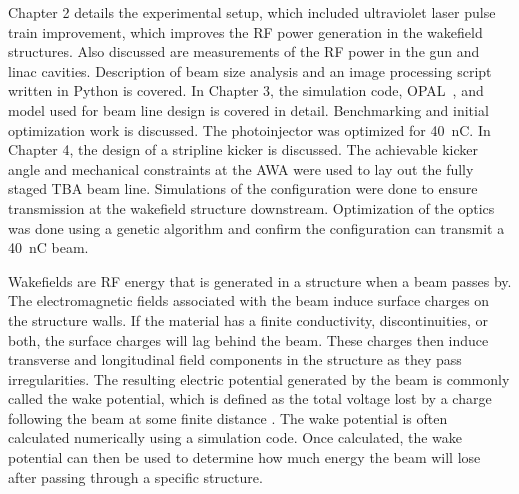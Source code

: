 Chapter 2 details the experimental setup, which included ultraviolet laser pulse train improvement, 
which improves the RF power generation in the wakefield structures.
Also discussed are measurements of the RF power in the gun and linac cavities.
Description of beam size analysis and an image processing script written in Python is covered.
In Chapter 3, the simulation code, OPAL~\cite{opal}, and model used for beam line design is covered in detail.
Benchmarking and initial optimization work is discussed. The photoinjector was optimized for \SI{40}{nC}. 
In Chapter 4, the design of a stripline kicker is discussed. 
The achievable kicker angle and mechanical constraints at the AWA 
were used to lay out the fully staged TBA beam line. 
Simulations of the configuration were done to ensure transmission at
the wakefield structure downstream. Optimization of the optics was done using 
a genetic algorithm and confirm the configuration can transmit a \SI{40}{nC} beam.



Wakefields are RF energy that is generated in a structure when a beam passes by. 
The electromagnetic fields
associated with the beam induce surface charges on the structure walls.
If the material has a finite conductivity, discontinuities, or both, the
surface charges will lag behind the beam. These charges then induce
transverse and longitudinal field components in the structure as they
pass irregularities. The resulting electric potential
generated by the beam is commonly called the wake potential, which
is defined as the total voltage lost by a charge following the beam
at some finite distance \cite{SLACwakefields}. The wake potential is 
often calculated numerically using a simulation code. Once calculated, 
the wake potential can then be used to determine how much energy the 
beam will lose after passing through a specific structure. 

